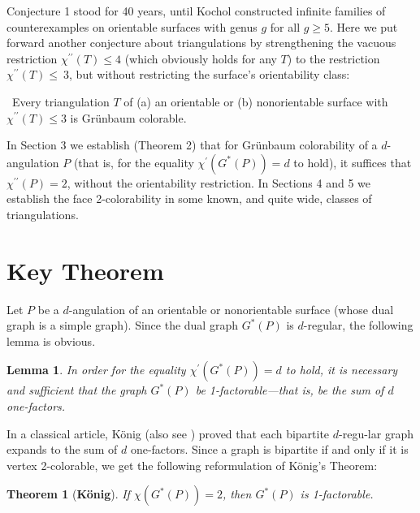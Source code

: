 \documentclass[12pt]{article}
\newtheorem{theorem}{Theorem}
\newtheorem{lemma}{Lemma}
\begin{document}
Conjecture 1 stood for 40 years, until Kochol \cite{Koch} constructed infinite families of counterexamples on orientable surfaces with genus $g$ for all $g \geqslant 5.$  Here we put forward another conjecture about triangulations by strengthening the vacuous restriction $\chi^{\prime\prime}(T)\leqslant 4$  (which obviously holds for any $T$) to the restriction $\chi^{\prime\prime}(T)\leqslant~3$, but without restricting the surface's orientability class:
\par\medskip    
\par\medskip   

~Every triangulation $T$  of (a) an orientable or (b) nonorientable surface with $\chi^{\prime\prime}(T)\leqslant 3$  is Gr\"unbaum colorable.
\par\medskip    
\par\medskip  

In Section 3 we establish (Theorem 2) that for Gr\"unbaum colorability of a $d$-angulation $P$  (that is, for the equality $\chi^{\prime}(G^*(P))=d$  to hold), it suffices that $\chi^{\prime\prime}(P) = 2$,  without the orientability restriction. In Sections 4 and 5 we establish the face 2-colorability in some known, and quite wide, classes of triangulations.

\section{Key Theorem}

Let $P$  be a $d$-angulation of an orientable or nonorientable surface (whose dual graph is a simple graph). Since the dual graph $G^*(P)$  is $d$-regular, the following lemma is obvious.

\begin{lemma}
In order for the equality $\chi^{\prime}(G^*(P))=d$  to hold, it is necessary and sufficient that the graph $G^*(P)$  be 1-factorable---that is, be the sum of $d$  one-factors.
\end{lemma}

In a classical article, K\"onig \cite{Ko} (also see \cite{LP}) proved that each bipartite $d\mbox{-}$regu-lar graph expands to the sum of $d$  one-factors. Since a graph is bipartite if and only if it is vertex 2-colorable, we get the following reformulation of K\"onig's Theorem:

\begin{theorem} [\bf K\"onig]
If $\chi(G^*(P))=2$, then $G^*(P)$  is 1-factorable.
\end{theorem}
   
\end{document}
